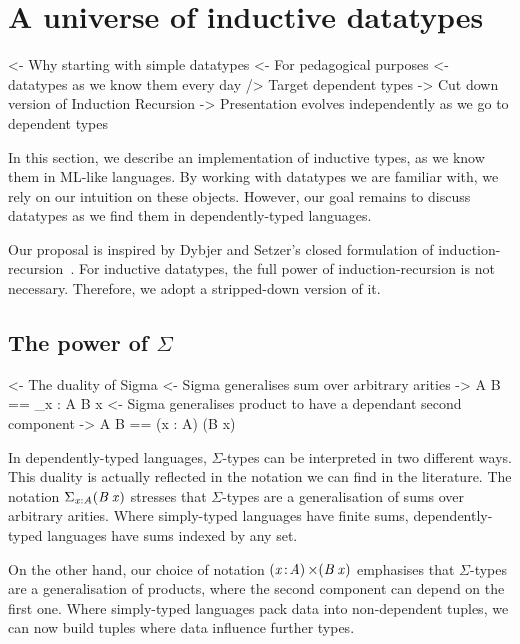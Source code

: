 \section{A universe of inductive datatypes}
\label{sec:universe-desc}

\begin{wstructure}
<- Why starting with simple datatypes
    <- For pedagogical purposes
        <- datatypes as we know them every day
        /> Target dependent types
    -> Cut down version of Induction Recursion
        -> Presentation evolves independently as we go to dependent types
\end{wstructure}

In this section, we describe an implementation of inductive types, as
we know them in ML-like languages. By working with datatypes we are
familiar with, we rely on our intuition on these objects. However, our
goal remains to discuss datatypes as we find them in dependently-typed
languages.

Our proposal is inspired by Dybjer and Setzer's closed formulation of
induction-recursion~\cite{dybjer:axiom-ir}. For inductive datatypes, the
full power of induction-recursion is not necessary. Therefore, we
adopt a stripped-down version of it. 

\subsection{The power of $\Sigma$}

\begin{wstructure}
<- The duality of Sigma
    <- Sigma generalises sum over arbitrary arities
        -> \Sigma A B == \Sigma_{x : A} B x
    <- Sigma generalises product to have a dependant second component
        -> \Sigma A B == (x : A) \times (B x)
\end{wstructure}

In dependently-typed languages, $\Sigma$-types can be interpreted in
two different ways. This duality is actually reflected in the notation
we can find in the literature. The notation $\blue{\Sigma}_{\V{x} :
  \V{A}} (\V{B}\: \V{x})$ stresses that $\Sigma$-types are a
generalisation of sums over arbitrary arities.  Where simply-typed
languages have finite sums, dependently-typed languages have sums
indexed by any set.

On the other hand, our choice of notation $\SIGMA{\V{x}}{\V{A}}
(\V{B}\:\V{x})$ emphasises that $\Sigma$-types are a generalisation of
products, where the second component can depend on the first
one. Where simply-typed languages pack data into non-dependent tuples,
we can now build tuples where data influence further types.

